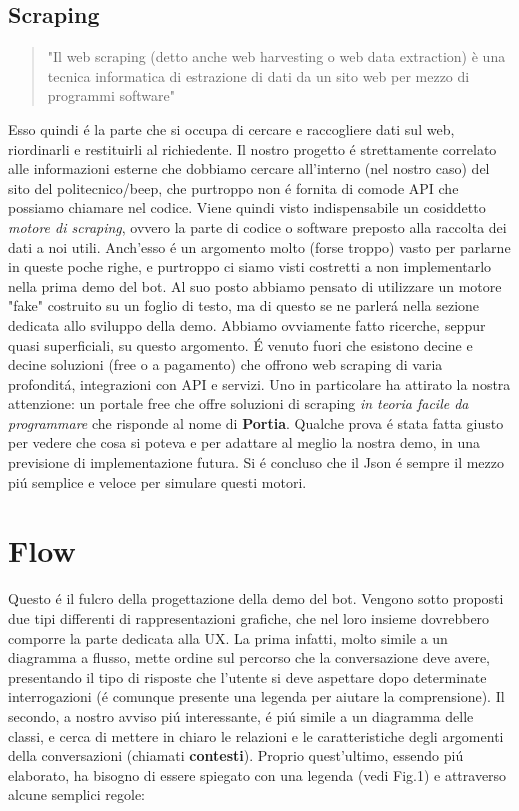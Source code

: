 \documentclass[]{article}
\begin{document}
\subsection{Scraping}
\begin{quote} 
"Il web scraping (detto anche web harvesting o web data extraction) è una tecnica informatica di estrazione di dati da un sito web per mezzo di programmi software"
\end{quote}
Esso quindi é la parte che si occupa di cercare e raccogliere dati sul web, riordinarli e restituirli al richiedente. Il nostro progetto é strettamente correlato alle informazioni esterne che dobbiamo cercare all'interno (nel nostro caso) del sito del politecnico/beep, che purtroppo non é fornita di comode API che possiamo chiamare nel codice. Viene quindi visto indispensabile un cosiddetto \textit{motore di scraping}, ovvero la parte di codice o software preposto alla raccolta dei dati a noi utili. Anch'esso é un argomento molto (forse troppo) vasto per parlarne in queste poche righe, e purtroppo ci siamo visti costretti a non implementarlo nella prima demo del bot. Al suo posto abbiamo pensato di utilizzare un motore "fake" costruito su un foglio di testo, ma di questo se ne parlerá nella sezione dedicata allo sviluppo della demo. Abbiamo ovviamente fatto ricerche, seppur quasi superficiali, su questo argomento. É venuto fuori che esistono decine e decine soluzioni (free o a pagamento) che offrono web scraping di varia profonditá, integrazioni con API e servizi. Uno in particolare ha attirato la nostra attenzione: un portale free che offre soluzioni di scraping \textit{in teoria facile da programmare} che risponde al nome di \textbf{Portia}. Qualche prova é stata fatta giusto per vedere che cosa si poteva e per adattare al meglio la nostra demo, in una previsione di implementazione futura. Si é concluso che il Json é sempre il mezzo piú semplice e veloce per simulare questi motori.

\section{Flow}
Questo é il fulcro della progettazione della demo del bot. Vengono sotto proposti due tipi differenti di rappresentazioni grafiche, che nel loro insieme dovrebbero comporre la parte dedicata alla UX. La prima infatti, molto simile a un diagramma a flusso, mette ordine sul percorso che la conversazione deve avere, presentando il tipo di risposte che l'utente si deve aspettare dopo determinate interrogazioni (é comunque presente una legenda per aiutare la comprensione). Il secondo, a nostro avviso piú interessante, é piú simile a un diagramma delle classi, e cerca di mettere in chiaro le relazioni e le caratteristiche degli argomenti della conversazioni (chiamati \textbf{contesti}). Proprio quest'ultimo, essendo piú elaborato, ha bisogno di essere spiegato con una legenda (vedi Fig.1) e attraverso alcune semplici regole:
\end{document}
